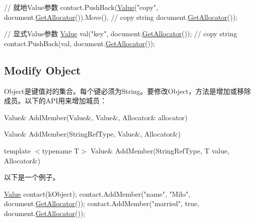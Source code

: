 \begin{DoxyCode}
\textcolor{comment}{// 就地Value参数}
contact.PushBack(\hyperlink{document_8h_a071cf97155ba72ac9a1fc4ad7e63d481}{Value}(\textcolor{stringliteral}{"copy"}, document.\hyperlink{class_generic_document_aa4609d6b19f86aec1a6b96edf2c27686}{GetAllocator}()).Move(), \textcolor{comment}{// copy string}
                 document.\hyperlink{class_generic_document_aa4609d6b19f86aec1a6b96edf2c27686}{GetAllocator}());

\textcolor{comment}{// 显式Value参数}
\hyperlink{class_generic_value}{Value} val(\textcolor{stringliteral}{"key"}, document.\hyperlink{class_generic_document_aa4609d6b19f86aec1a6b96edf2c27686}{GetAllocator}()); \textcolor{comment}{// copy string}
contact.PushBack(val, document.\hyperlink{class_generic_document_aa4609d6b19f86aec1a6b96edf2c27686}{GetAllocator}());
\end{DoxyCode}
\hypertarget{md_Cadriciel_Commun_Externe_RapidJSON_doc_tutorial.zh-cn_ModifyObject}{}\subsection{Modify Object}\label{md_Cadriciel_Commun_Externe_RapidJSON_doc_tutorial.zh-cn_ModifyObject}
Object是键值对的集合。每个键必须为\+String。要修改\+Object，方法是增加或移除成员。以下的\+A\+P\+I用来增加城员：


\begin{DoxyItemize}
\item {\ttfamily Value\& Add\+Member(\+Value\&, Value\&, Allocator\& allocator)}
\item {\ttfamily Value\& Add\+Member(\+String\+Ref\+Type, Value\&, Allocator\&)}
\item {\ttfamily template $<$typename T$>$ Value\& Add\+Member(\+String\+Ref\+Type, T value, Allocator\&)}
\end{DoxyItemize}

以下是一个例子。


\begin{DoxyCode}
\hyperlink{class_generic_value}{Value} contact(kObject);
contact.AddMember(\textcolor{stringliteral}{"name"}, \textcolor{stringliteral}{"Milo"}, document.\hyperlink{class_generic_document_aa4609d6b19f86aec1a6b96edf2c27686}{GetAllocator}());
contact.AddMember(\textcolor{stringliteral}{"married"}, \textcolor{keyword}{true}, document.\hyperlink{class_generic_document_aa4609d6b19f86aec1a6b96edf2c27686}{GetAllocator}());
\end{DoxyCode}


